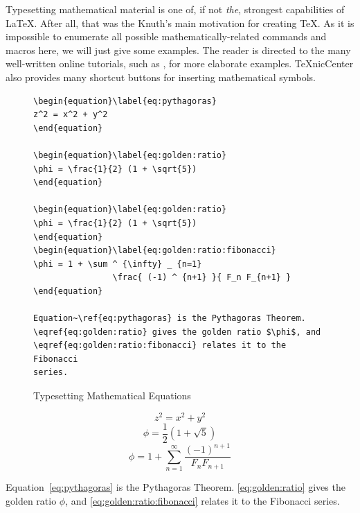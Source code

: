 Typesetting mathematical material is one of, if not \emph{the}, strongest capabilities of \LaTeX.  After all, that was the Knuth's main motivation for creating \TeX{}.  As it is impossible to enumerate all possible mathematically-related commands and macros here, we will just give some examples.  The reader is directed to the many well-written online tutorials, such as \citep{roberts}, for more elaborate examples.  TeXnicCenter also provides many shortcut buttons for inserting mathematical symbols.

\begin{figure}[htb!]
\begin{lstlisting}
\begin{equation}\label{eq:pythagoras}
z^2 = x^2 + y^2
\end{equation}

\begin{equation}\label{eq:golden:ratio}
\phi = \frac{1}{2} (1 + \sqrt{5})
\end{equation}

\begin{equation}\label{eq:golden:ratio}
\phi = \frac{1}{2} (1 + \sqrt{5})
\end{equation}
\begin{equation}\label{eq:golden:ratio:fibonacci}
\phi = 1 + \sum ^ {\infty} _ {n=1}
                \frac{ (-1) ^ {n+1} }{ F_n F_{n+1} }
\end{equation}

Equation~\ref{eq:pythagoras} is the Pythagoras Theorem. 
\eqref{eq:golden:ratio} gives the golden ratio $\phi$, and 
\eqref{eq:golden:ratio:fibonacci} relates it to the Fibonacci 
series.
\end{lstlisting}
\caption{Typesetting Mathematical Equations}\label{fig:lst:equation}
\end{figure}

\begin{equation}\label{eq:pythagoras}
z^2 = x^2 + y^2
\end{equation}
\begin{equation}\label{eq:golden:ratio}
\phi = \frac{1}{2} (1 + \sqrt{5})
\end{equation}
\begin{equation}\label{eq:golden:ratio:fibonacci}
\phi = 1 + \sum ^ {\infty} _ {n=1}
                \frac{ (-1) ^ {n+1} }{ F_n F_{n+1} }
\end{equation}

Equation~\ref{eq:pythagoras} is the Pythagoras Theorem. \eqref{eq:golden:ratio} gives the golden ratio $\phi$, and \eqref{eq:golden:ratio:fibonacci} relates it to the Fibonacci series.

